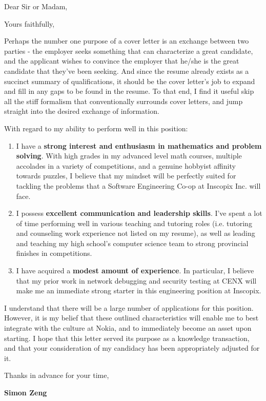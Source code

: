 \documentclass[12pt,a4paper,sans]{moderncv}        %
\begin{document}
\date{January 18, 2019}
\opening{Dear Sir or Madam,}
\closing{Yours faithfully,}
\makelettertitle

Perhaps the number one purpose of a cover letter is an exchange between two 
parties - the employer seeks something that can characterize a great candidate, 
and the applicant wishes to convince the employer that he/she is the great 
candidate that they've been seeking. And since the resume already exists as a 
succinct summary of qualifications, it should be the cover letter's job to 
expand and fill in any gaps to be found in the resume. To that end, I find it 
useful skip all the stiff formalism that conventionally surrounds cover letters, 
and jump straight into the desired exchange of information.

With regard to my ability to perform well in this position:
\smallskip
\begin{enumerate}
    \item I have a \textbf{strong interest and enthusiasm in mathematics and 
            problem solving}. With high grades in my advanced level math 
        courses, multiple accolades in a variety of competitions, and a genuine 
        hobbyist affinity towards puzzles, I believe that my mindset will be 
        perfectly suited for tackling the problems that a Software Engineering 
        Co-op at Inscopix Inc. will face. 
        \smallskip
    \item I possess \textbf{excellent communication and leadership skills}. I've 
        spent a lot of time performing well in various teaching and tutoring 
        roles (i.e. tutoring and counseling work experience not listed on my 
        resume), as well as leading and teaching my high school's computer 
        science team to strong provincial finishes in competitions.
        \smallskip
    \item I have acquired a \textbf{modest amount of experience}. In particular, I 
        believe that my prior work in network debugging and security testing at 
        CENX will make me an immediate strong starter in this engineering position 
        at Inscopix.
\end{enumerate}

I understand that there will be a large number of applications for this 
position. However, it is my belief that these outlined characteristics will 
enable me to best integrate with the culture at Nokia, and to immediately 
become an asset upon starting. I hope that this letter served its purpose as a 
knowledge transaction, and that your consideration of my candidacy has been 
appropriately adjusted for it.
\smallskip

Thanks in advance for your time,

\textbf{Simon Zeng}

\end{document}
